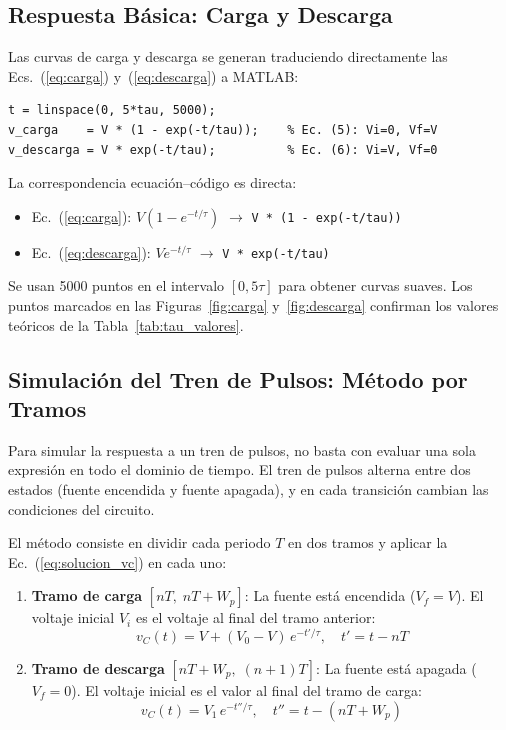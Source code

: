 \documentclass[12pt,a4paper]{article}
\begin{document}
\subsection{Respuesta B\'asica: Carga y Descarga}

Las curvas de carga y descarga se generan traduciendo directamente las Ecs.~(\ref{eq:carga}) y~(\ref{eq:descarga}) a MATLAB:

\begin{lstlisting}[style=matlab, caption={Traducci\'on directa de las ecuaciones a c\'odigo MATLAB.}]
t = linspace(0, 5*tau, 5000);
v_carga    = V * (1 - exp(-t/tau));    % Ec. (5): Vi=0, Vf=V
v_descarga = V * exp(-t/tau);          % Ec. (6): Vi=V, Vf=0
\end{lstlisting}

La correspondencia ecuaci\'on--c\'odigo es directa:
\begin{itemize}
    \item Ec.~(\ref{eq:carga}): $V(1 - e^{-t/\tau})$ $\longrightarrow$ \texttt{V * (1 - exp(-t/tau))}
    \item Ec.~(\ref{eq:descarga}): $Ve^{-t/\tau}$ $\longrightarrow$ \texttt{V * exp(-t/tau)}
\end{itemize}

Se usan 5000 puntos en el intervalo $[0, 5\tau]$ para obtener curvas suaves. Los puntos marcados en las Figuras~\ref{fig:carga} y~\ref{fig:descarga} confirman los valores te\'oricos de la Tabla~\ref{tab:tau_valores}.

\subsection{Simulaci\'on del Tren de Pulsos: M\'etodo por Tramos}

Para simular la respuesta a un tren de pulsos, no basta con evaluar una sola expresi\'on en todo el dominio de tiempo. El tren de pulsos alterna entre dos estados (fuente encendida y fuente apagada), y en cada transici\'on cambian las condiciones del circuito.

El m\'etodo consiste en dividir cada periodo $T$ en dos tramos y aplicar la Ec.~(\ref{eq:solucion_vc}) en cada uno:

\begin{enumerate}
    \item \textbf{Tramo de carga} $[nT, \; nT + W_p]$: La fuente est\'a encendida ($V_f = V$). El voltaje inicial $V_i$ es el voltaje al final del tramo anterior:
    \begin{equation}
        v_C(t) = V + (V_0 - V)\, e^{-t'/\tau}, \quad t' = t - nT
    \end{equation}

    \item \textbf{Tramo de descarga} $[nT + W_p, \; (n+1)T]$: La fuente est\'a apagada ($V_f = 0$). El voltaje inicial es el valor al final del tramo de carga:
    \begin{equation}
        v_C(t) = V_1\, e^{-t''/\tau}, \quad t'' = t - (nT + W_p)
    \end{equation}
\end{enumerate}
\end{document}
